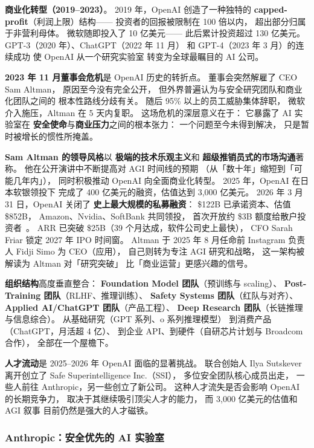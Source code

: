 \textbf{商业化转型（2019--2023）}。
2019 年，OpenAI 创造了一种独特的
\textbf{capped-profit}（利润上限）结构——
投资者的回报被限制在 100 倍以内，
超出部分归属于非营利母体。
微软随即投入了 10 亿美元——
此后累计投资超过 130 亿美元。
GPT-3（2020 年）、ChatGPT（2022 年 11 月）
和 GPT-4（2023 年 3 月）的连续成功
使 OpenAI 从一个研究实验室
转变为全球最瞩目的 AI 公司。

\textbf{2023 年 11 月董事会危机}是 OpenAI 历史的转折点。
董事会突然解雇了 CEO Sam Altman，
原因至今没有完全公开，
但外界普遍认为与安全研究团队和商业化团队之间的
根本性路线分歧有关。
随后 95\% 以上的员工威胁集体辞职，
微软介入施压，Altman 在 5 天内复职。
这场危机的深层意义在于：
它暴露了 AI 实验室在
\textbf{安全使命}与\textbf{商业压力}之间的根本张力：
一个问题至今未得到解决，
只是暂时被增长的惯性所掩盖。

\textbf{Sam Altman 的领导风格}以
\textbf{极端的技术乐观主义}和
\textbf{超级推销员式的市场沟通}著称。
他在公开演讲中不断提高对 AGI 时间线的预期
（从「数十年」缩短到「可能几年内」），
同时积极推动 OpenAI 向全面商业化转型。
2025 年，OpenAI 在日本软银领投下
完成了 400 亿美元的融资，估值达到 3,000 亿美元。
2026 年 3 月 31 日，OpenAI 关闭了
\textbf{史上最大规模的私募融资}：
\$122B 已承诺资本、估值 \$852B，
Amazon、Nvidia、SoftBank 共同领投，
首次开放约 \$3B 额度给散户投资者~\cite{openai_852b_round_2026}。
ARR 已突破 \$25B（39 个月达成，软件公司史上最快），
CFO Sarah Friar 锁定 2027 年 IPO 时间窗。
Altman 于 2025 年 8 月任命前 Instagram 负责人
Fidji Simo 为 CEO（应用），
自己则转为专注 AGI 研究和战略，
这一架构被解读为 Altman 对「研究突破」
比「商业运营」更感兴趣的信号。

\textbf{组织结构}高度垂直整合：
\textbf{Foundation Model 团队}（预训练与 scaling）、
\textbf{Post-Training 团队}（RLHF、推理训练）、
\textbf{Safety Systems 团队}（红队与对齐）、
\textbf{Applied AI/ChatGPT 团队}（产品工程）、
\textbf{Deep Research 团队}（长链推理与信息综合）。
从基础研究（GPT 系列、o 系列推理模型）
到消费产品（ChatGPT，月活超 4 亿）、
到企业 API、到硬件（自研芯片计划与 Broadcom 合作），
全部在一个屋檐下。

\textbf{人才流动}是 2025--2026 年 OpenAI 面临的显著挑战。
联合创始人 Ilya Sutskever 离开创立了
Safe Superintelligence Inc.（SSI），
多位安全团队核心成员出走，
一些人前往 Anthropic，另一些创立了新公司。
这种人才流失是否会影响 OpenAI 的长期竞争力，
取决于其继续吸引顶尖人才的能力，
而 3,000 亿美元的估值和 AGI 叙事
目前仍然是强大的人才磁铁。

\subsubsection{Anthropic：安全优先的 AI 实验室}

